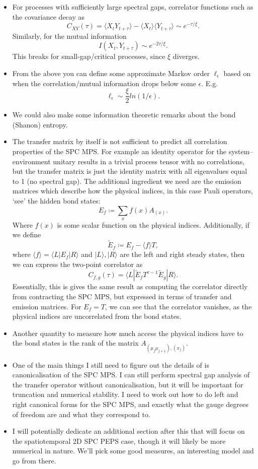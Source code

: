 \begin{itemize}
    \item For processes with sufficiently large spectral gaps, correlator functions such as the covariance decay as
    \[
    C_{XY}(\tau) = \langle X_t Y_{t+\tau} \rangle - \langle X_t \rangle \langle Y_{t+\tau} \rangle \sim e^{-\tau/\xi}.
    \]
    Similarly, for the mutual information
    \[
    I(X_t, Y_{t+\tau}) \sim e^{-2\tau/\xi}.
    \]
    This breaks for small-gap/critical processes, since $\xi$ diverges.
    \item From the above you can define some approximate Markov order \(\ell_\epsilon\) based on when the correlation/mutual information drops below some $\epsilon$. E.g.
    \[\ell_\epsilon \sim \frac{\xi}{2} ln(1/\epsilon).\]
    \item We could also make some information theoretic remarks about the bond (Shanon) entropy.
    \item The transfer matrix by itself is not sufficient to predict all correlation properties of the SPC MPS. For example an identity operator for the system--environment unitary results in a trivial process tensor with no correlations, but the transfer matrix is just the identity matrix with all eigenvalues equal to 1 (no spectral gap). The additional ingredient we need are the emission matrices which describe how the physical indices, in this case Pauli operators, `see' the hidden bond states:
    \[
    E_f \coloneq \sum_x f(x) A_{(x)}.
    \]
    Where $f(x)$ is some scalar function on the physical indices. Additionally, if we define
    \[
    \widetilde{E}_f \coloneq E_f - \langle f \rangle T,
    \]
    where \(\langle f \rangle = \langle L | E_f | R \rangle\) and \(|L\rangle, |R\rangle\) are the left and right steady states, then we can express the two-point correlator as 
    \[
    C_{f,g}(\tau) = \langle L | \widetilde{E}_f T^{\tau - 1} \widetilde{E}_g | R \rangle.
    \]
    Essentially, this is gives the same result as computing the correlator directly from contracting the SPC MPS, but expressed in terms of transfer and emission matrices. For $E_f = T$, we can see that the correlator vanishes, as the physical indices are uncorrelated from the bond states.
    \item Another quantity to measure how much access the physical indices have to the bond states is the rank of the matrix \(A_{(\mu_j \mu_{j+1}),(x_j)}\).
    \item One of the main things I still need to figure out the details of is canonicalisation of the SPC MPS. I can still perform spectral gap analysis of the transfer operator without canonicalisation, but it will be important for truncation and numerical stability. I need to work out how to do left and right canonical forms for the SPC MPS, and exactly what the gauge degrees of freedom are and what they correspond to.
    \item I will potentially dedicate an additional section after this that will focus on the spatiotemporal 2D SPC PEPS case, though it will likely be more numerical in nature. We'll pick some good measures, an interesting model and go from there.
\end{itemize}
